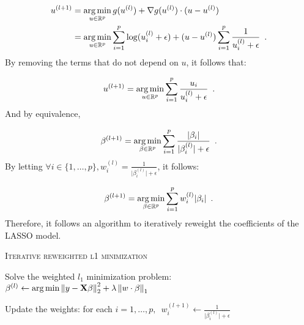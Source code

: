 \documentclass[a4paper,10pt]{article}
\theoremstyle{definition}
\begin{document}
\begin{align*}
    u^{(l+1)} &= \operatorname*{arg\,min}_{u \in \mathbb{R}^p} g(u^{(l)}) + \nabla g(u^{(l)})\cdot (u - u^{(l)}) \\
              &= \operatorname*{arg\,min}_{u \in \mathbb{R}^p} \sum_{i=1}^p \log( u_i^{(l)} + \epsilon) + (u - u^{(l)}) \sum_{i=1}^p \frac{1}{ u_i^{(l)}  + \epsilon}
    \enspace .
\end{align*}
%
By removing the terms that do not depend on $u$, it follows that:

\begin{equation*}
    u^{(l+1)} = \operatorname*{arg\,min}_{u \in \mathbb{R}^p}
    \sum_{i=1}^p \frac{u_i}{ u_i^{(l)} + \epsilon}
    \enspace .
\end{equation*}
%
And by equivalence,

\begin{equation*}
    \beta^{(l+1)} = \operatorname*{arg\,min}_{\beta \in \mathbb{R}^p}
    \sum_{i=1}^p \frac{\lvert \beta_i \rvert}{\lvert \beta_i^{(l)} \rvert + \epsilon}
    \enspace .
\end{equation*}
%
By letting $\forall i \in \{1, \dots, p\}, w_i^{(l)} = \frac{1}{\lvert \beta_i^{(l)}\rvert + \epsilon}$, it follows:

\begin{equation*}
    \beta^{(l+1)} = \operatorname*{arg\,min}_{\beta \in \mathbb{R}^p}
    \sum_{i=1}^p w_i^{(l)} \lvert \beta_i \rvert
    \enspace .
\end{equation*}
%
Therefore, it follows an algorithm to iteratively reweight the coefficients of the LASSO model.

\vskip 0.2in

{\fontsize{4}{4}\selectfont
\begin{algorithm}[h]  %
\caption{\textsc{Iterative reweighted l1 minimization}
}
%


    {
        Solve the weighted $l_1$ minimization problem:
        $\beta^{(l)} \leftarrow \operatorname*{arg\,min} \left \lVert  y -  \mathbf{X} \beta \right \rVert_2^2 + \lambda \left \lVert  w \cdot \beta \right \rVert_1$

        Update the weights: for each
        $i = 1, \dots, p, \enspace w_i^{(l+1)} \leftarrow \frac{1}{\lvert \beta_i^{(l)} \rvert + \epsilon}$
    }

\Return{$\beta$}
\end{algorithm}
}
\end{document}
